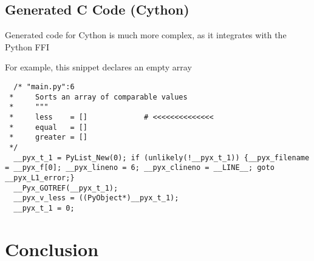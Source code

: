 \documentclass{article}
\begin{document}
\newpage
\subsection{Generated C Code (Cython)}

Generated code for Cython is much more complex, as it integrates with the Python FFI

For example, this snippet declares an empty array

\begin{lstlisting}
  /* "main.py":6
 *     Sorts an array of comparable values
 *     """
 *     less    = []             # <<<<<<<<<<<<<<
 *     equal   = []
 *     greater = []
 */
  __pyx_t_1 = PyList_New(0); if (unlikely(!__pyx_t_1)) {__pyx_filename = __pyx_f[0]; __pyx_lineno = 6; __pyx_clineno = __LINE__; goto __pyx_L1_error;}
  __Pyx_GOTREF(__pyx_t_1);
  __pyx_v_less = ((PyObject*)__pyx_t_1);
  __pyx_t_1 = 0;
\end{lstlisting}

\newpage

\section{Conclusion}
\end{document}
